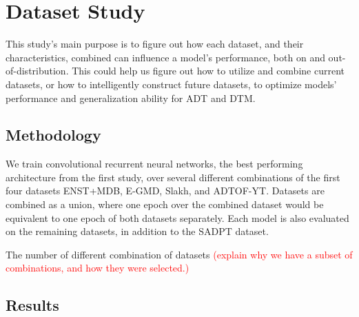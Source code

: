 \chapter{Dataset Study}

This study's main purpose is to figure out how each dataset, and their characteristics, combined can influence a model's performance, both on and out-of-distribution. This could help us figure out how to utilize and combine current datasets, or how to intelligently construct future datasets, to optimize models' performance and generalization ability for \acrfull{ADT} and \acrfull{DTM}.

\section{Methodology}

We train convolutional recurrent neural networks, the best performing architecture from the first study, over several different combinations of the first four datasets ENST+MDB, E-GMD, Slakh, and ADTOF-YT. Datasets are combined as a union, where one epoch over the combined dataset would be equivalent to one epoch of both datasets separately. Each model is also evaluated on the remaining datasets, in addition to the SADPT dataset.

The number of different combination of datasets \textcolor{red}{(explain why we have a subset of combinations, and how they were selected.)}

\section{Results}

